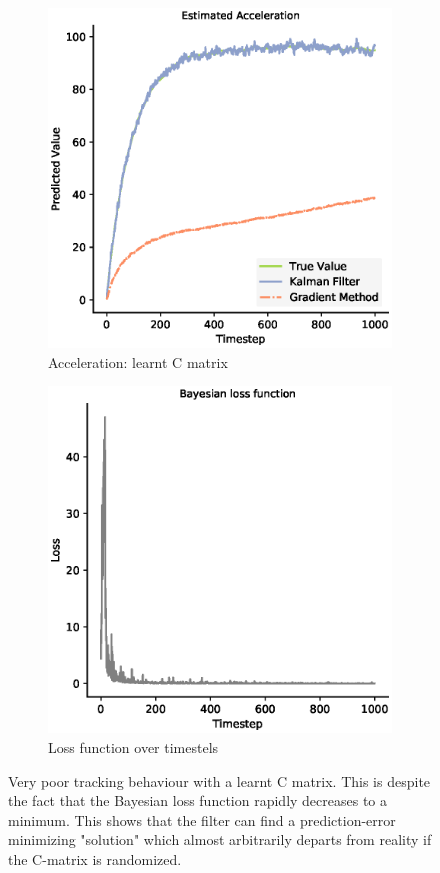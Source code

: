 \begin{figure}
  \begin{subfigure}{0.33\textwidth}\quad
    \centering
    \includegraphics[width=.8\linewidth]{chapter_3_figures/Estimated_Acceleration_C_matrix.eps}
    \caption{Acceleration: learnt C matrix}
  \end{subfigure}
  \medskip

  \begin{subfigure}{0.5\textwidth}
    \centering
    \includegraphics[width=.8\linewidth]{chapter_3_figures/NKF_C_matrix_loss.eps}
    \caption{Loss function over timestels}
  \end{subfigure}
  
  \caption{Very poor tracking behaviour with a learnt C matrix. This is despite the fact that the Bayesian loss function rapidly decreases to a minimum. This shows that the filter can find a prediction-error minimizing "solution" which almost arbitrarily departs from reality if the C-matrix is randomized.}
\end{figure}

